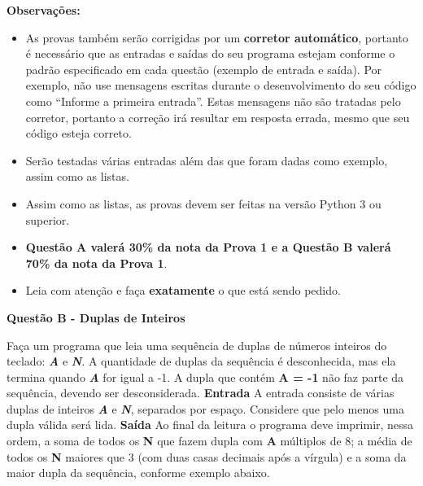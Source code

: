 \documentclass[a4paper, 12pt]{article}
\begin{document}
\textbf{{\large Observações:}}
\begin{itemize}
	\item As provas também serão corrigidas por um \textbf{corretor automático}, portanto é necessário que as entradas e saídas do seu programa estejam conforme o padrão especificado em cada questão (exemplo de entrada e saída). Por exemplo, não use mensagens escritas durante o desenvolvimento do seu código como “Informe a primeira entrada”. Estas mensagens não são tratadas pelo corretor, portanto a correção irá resultar em resposta errada, mesmo que seu código esteja correto.
	\item Serão testadas várias entradas além das que foram dadas como exemplo, assim como as listas.
	\item Assim como as listas, as provas devem ser feitas na versão Python 3 ou superior.
	\item \textbf{Questão A valerá 30\% da nota da Prova 1 e a Questão B valerá 70\% da nota da Prova 1}.
	\item Leia com atenção e faça \textbf{exatamente} o que está sendo pedido.
\end{itemize}
\newpage %
\begin{center}
\textbf{{\Large Questão B - Duplas de Inteiros}}
\end{center}
\vspace{5pt}
Faça um programa que leia uma sequência de duplas de números inteiros do teclado: \textbf{\textit{A}} e \textbf{\textit{N}}. A quantidade de duplas da sequência é desconhecida, mas ela termina quando \textbf{\textit{A}} for igual a -1. A dupla que contém \textbf{A = -1} não faz parte da sequência, devendo ser desconsiderada.
\newline \newline
\textbf{{\large Entrada}} \newline
A entrada consiste de várias duplas de inteiros \textbf{\textit{A}} e \textbf{\textit{N}}, separados por espaço. Considere que pelo menos uma dupla válida será lida.
\newline \newline
\textbf{{\large Saída}} \newline
Ao final da leitura o programa deve imprimir, nessa ordem, a soma de todos os \textbf{N} que fazem dupla com \textbf{A} múltiplos de 8; a média de todos os \textbf{N} maiores que 3 (com duas casas decimais após a vírgula) e a soma da maior dupla da sequência, conforme exemplo abaixo.
\newline
\end{document}
